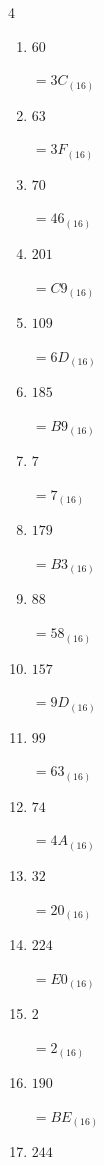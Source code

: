 \begin{multicols}{4}
\begin{enumerate}
  \item $60$

        $=3C_{(16)}$

  \item $63$

        $=3F_{(16)}$

  \item $70$

        $=46_{(16)}$

  \item $201$

        $=C9_{(16)}$

  \item $109$

        $=6D_{(16)}$

  \item $185$

        $=B9_{(16)}$

  \item $7$

        $=7_{(16)}$

  \item $179$

        $=B3_{(16)}$

  \item $88$

        $=58_{(16)}$

  \item $157$

        $=9D_{(16)}$

  \item $99$

        $=63_{(16)}$

  \item $74$

        $=4A_{(16)}$

  \item $32$

        $=20_{(16)}$

  \item $224$

        $=E0_{(16)}$

  \item $2$

        $=2_{(16)}$

\columnbreak %

  \item $190$

        $=BE_{(16)}$

  \item $244$


\end{enumerate}
\end{multicols}
